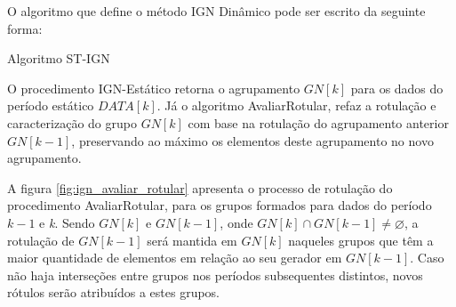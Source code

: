 O algoritmo que define o método IGN Dinâmico pode ser escrito da seguinte forma:

\begin{algorithm}[!ht]
	\SetSpacedAlgorithm
	\caption{\label{alg:algoritmo_stign}Algoritmo ST-IGN}
	\Inicio{
	    i = TPE\;
	    k = 1\;
	    s = 0\;
	    \Enqto{${s \geqslant NE}$}{
    	    \Se {${s = 0}$} {
	            ${t_1 = 1}$\;
    	    }
    	    \Senao {
    	        ${t_1 = t_1 + TPD}$\;
    	    }
    	    ${t_2 = t_1 + TPE + GD - 1}$\;
    	    ${DATA[k] = \{ I_s, s = t_1, ..., t_2 \} }$\;
    	    IGN-Estatico(${DATA[k], GN[k]}$)\;
    	    AvaliarRotular(${GN[k]}$, ${GN[[k-1]}$)\;
    	    ${k = k + 1}$\;
	    }
	}
\end{algorithm}

O procedimento IGN-Estático retorna o agrupamento ${GN[k]}$ para os dados do período estático ${DATA[k]}$. Já o algoritmo AvaliarRotular, refaz a rotulação e caracterização do grupo ${GN[k]}$ com base na rotulação do agrupamento anterior ${GN[k - 1]}$, preservando ao máximo os elementos deste agrupamento no novo agrupamento.

A figura \ref{fig:ign_avaliar_rotular} apresenta o processo de rotulação do procedimento AvaliarRotular, para os grupos formados para dados do período ${k - 1}$ e \textit{k}. Sendo ${GN[k]}$ e ${GN[k - 1]}$, onde ${GN[k] \cap GN[k - 1] \neq \varnothing 
}$, a rotulação de ${GN[k - 1]}$ será mantida em ${GN[k]}$ naqueles grupos que têm a maior quantidade de elementos em relação ao seu gerador em ${GN[k - 1]}$. Caso não haja interseções entre grupos nos períodos subsequentes distintos, novos rótulos serão atribuídos a estes grupos.

